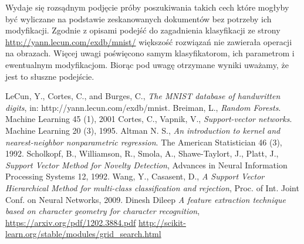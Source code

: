 \documentclass{article}
\begin{document}
Wydaje się rozsądnym podjęcie próby poszukiwania takich cech które mogłyby być wyliczane na podstawie zeskanowanych dokumentów bez potrzeby ich modyfikacji. Zgodnie z opisami podejść do zagadnienia klasyfikacji ze strony \href{http://yann.lecun.com/exdb/mnist/}{http://yann.lecun.com/exdb/mnist/} większość rozwiązań nie zawierała operacji na obrazach. Więcej uwagi poświęcono samym klasyfikatorom, ich parametrom i ewentualnym modyfikacjom. Biorąc pod uwagę otrzymane wyniki uważamy, że jest to słuszne podejście.

\newpage
\begin{thebibliography}{9}
	 LeCun, Y., Cortes, C., and Burges, C., \emph{The MNIST database of handwritten digits}, in: http://yann.lecun.com/exdb/mnist.
	 Breiman, L., \emph{Random Forests}. Machine Learning 45 (1), 2001
	 Cortes, C., Vapnik, V., \emph{Support-vector networks}. Machine Learning 20 (3), 1995.	
	 Altman N. S., \emph{An introduction to kernel and nearest-neighbor nonparametric regression}. The American Statistician 46 (3), 1992.
     Scholkopf, B., Williamson, R., Smola, A., Shawe-Taylort, J., Platt, J., \emph{Support Vector Method for Novelty Detection}, Advances in Neural Information Processing Systems 12, 1992. 
     Wang, Y., Casasent, D., \emph{A Support Vector Hierarchical Method for multi-class classification and rejection}, Proc. of Int. Joint Conf. on Neural Networks, 2009.
     Dinesh Dileep \emph{A feature extraction technique based on character geometry for character recognition}, \href{https://arxiv.org/pdf/1202.3884.pdf}{https://arxiv.org/pdf/1202.3884.pdf}
     \href{http://scikit-learn.org/stable/modules/grid\_search.html}{http://scikit-learn.org/stable/modules/grid\_search.html}


\end{thebibliography}
\end{document}
